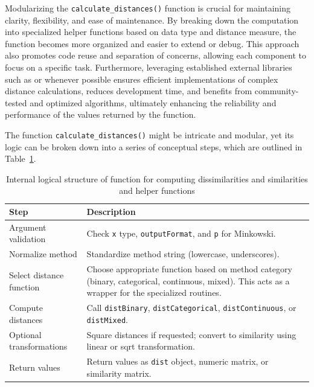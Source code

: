 Modularizing the \texttt{calculate\_distances()} function is crucial for maintaining clarity, flexibility, and ease of maintenance. By breaking down the computation into specialized helper functions based on data type and distance measure, the function becomes more organized and easier to extend or debug. This approach also promotes code reuse and separation of concerns, allowing each component to focus on a specific task. Furthermore, leveraging established external libraries such as  or  whenever possible ensures efficient implementations of complex distance calculations, reduces development time, and benefits from community-tested and optimized algorithms, ultimately enhancing the reliability and performance of the values returned by the function.

The function \texttt{calculate\_distances()} might be intricate and modular, yet its logic can be broken down into a series of conceptual steps, which are outlined in Table~\ref{tab:modular-structure-calculate-distances}.

\begin{table}
\caption{Internal logical structure of function for computing dissimilarities and similarities and helper functions}
\label{tab:modular-structure-calculate-distances}
\begin{center}
{\footnotesize
\begin{tabular}{|p{3.5cm}p{10.2cm}|}
\hline
\textbf{Step} & \textbf{Description} \\
\hline
Argument validation & Check \texttt{x} type, \texttt{outputFormat}, and \texttt{p} for Minkowski. \\
\hline
Normalize method & Standardize method string (lowercase, underscores). \\
\hline
Select distance function & Choose appropriate function based on method category (binary, categorical, continuous, mixed). This acts as a wrapper for the specialized routines. \\
\hline
Compute distances & Call \texttt{distBinary}, \texttt{distCategorical}, \texttt{distContinuous}, or \texttt{distMixed}. \\
\hline
Optional transformations & Square distances if requested; convert to similarity using linear or sqrt transformation. \\
\hline
Return values & Return values as \texttt{dist} object, numeric matrix, or similarity matrix. \\
\hline
\end{tabular}}
\end{center}
\end{table}

